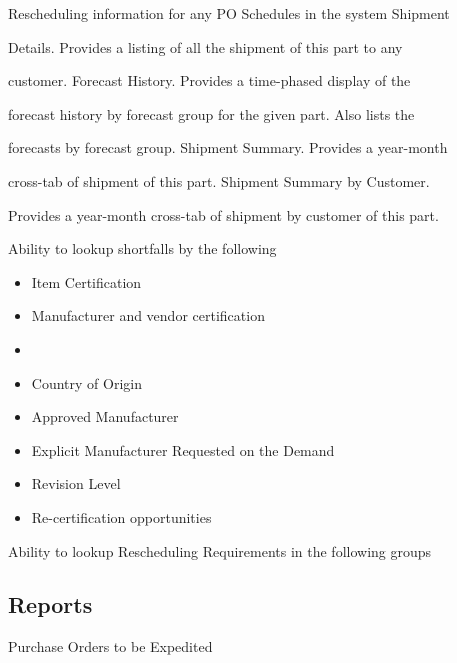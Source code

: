 \documentclass[letterpaper,10pt,english]{sphinxmanual}
\begin{document}
\begin{DUlineblock}{0em}
\item[] Rescheduling information for any PO Schedules in the system Shipment
\item[] Details. Provides a listing of all the shipment of this part to any
\item[] customer. Forecast History. Provides a time-phased display of the
\item[] forecast history by forecast group for the given part. Also lists the
\item[] forecasts by forecast group. Shipment Summary. Provides a year-month
\item[] cross-tab of shipment of this part. Shipment Summary by Customer.
\item[] Provides a year-month cross-tab of shipment by customer of this part.
\item[] Ability to lookup shortfalls by the following
\end{DUlineblock}
\begin{itemize}
\item {} 
Item Certification

\item {} 
Manufacturer and vendor certification

\item {} 

\item {} 
Country of Origin

\item {} 
Approved Manufacturer

\item {} 
Explicit Manufacturer Requested on the Demand

\item {} 
Revision Level

\item {} 
Re-certification opportunities

\end{itemize}

Ability to lookup Rescheduling Requirements in the following groups


\subsection{Reports}
\label{APS/APS-Features-and-Benefits:reports}
\begin{DUlineblock}{0em}
\item[] Purchase Orders to be Expedited
\end{DUlineblock}
\end{document}
